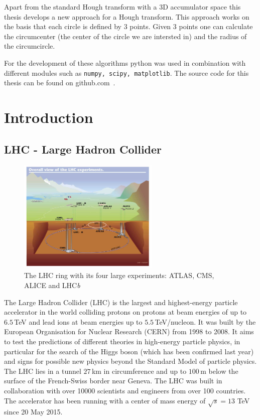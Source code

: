 \documentclass[11pt]{scrreprt}
\begin{document}
Apart from the standard Hough transform with a 3D accumulator space this thesis develops a new approach for a Hough transform. 
This approach works on the basis that each circle is defined by 3 points. Given 3 points one can calculate the circumcenter 
(the center of the circle we are intersted in) and the radius of the circumcircle.

For the development of these algorithms python was used in combination with different modules such as \texttt{numpy, scipy, matplotlib}. The source code for this thesis can be found on github.com~\cite{Gloor2016}.

\tableofcontents
\listoftables
\listoffigures	
\listofcodesnippets

\chapter{Introduction}
\section{LHC - Large Hadron Collider} %
\label{sec:lhc_large_hadron_collider}
\begin{figure}[htb]
  \centering
  \includegraphics[width=0.6\textwidth]{pics/lhc}
  \caption{The LHC ring with its four large experiments: ATLAS, CMS, ALICE and LHC\textit{b}}
  \label{fig:lhc}
\end{figure}

The Large Hadron Collider (LHC) is the largest and highest-energy particle accelerator in the world colliding protons on protons
at beam energies of up to $6.5$\,TeV and lead ions at beam energies up to $5.5$\,TeV/nucleon. It was built by the European 
Organisation for Nuclear Research (CERN) from 1998 to 2008. It aims to test the predictions of different theories in high-energy particle 
physics, in particular for the search of the Higgs boson (which has been confirmed last year) and signs for possible new physics beyond 
the Standard Model of particle physics. The LHC lies in a tunnel $27$\,km in circumference and up to $100$\,m below the surface of the 
French-Swiss border near Geneva. The LHC was built in collaboration with over 10000 scientists and engineers from over 100 countries. 
The accelerator has been running with a center of mass energy of $\sqrt{s} = 13$ TeV since 20 May 2015.
\end{document}
